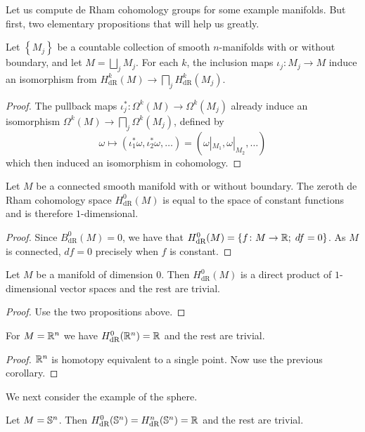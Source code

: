 \documentclass[a4paper, 12pt]{article}
\begin{document}
Let us compute de Rham cohomology groups for some example manifolds.
But first, two elementary propositions that will help us greatly.
\begin{proposition}
    Let $\left\{ M_j \right\}$ be a countable collection of smooth
    $n$-manifolds with or without boundary, and let $M = \bigsqcup_j M_j$. For
    each $k$, the inclusion maps $\iota_j \colon M_j \to M$ induce an
    isomorphism from $H_{\text{dR}}^k(M) \to \bigsqcap_j H_{\text{dR}}^k(M_j)$.
\end{proposition}
\begin{proof}
    The pullback maps $\iota_j^* \colon \Omega^k(M) \to \Omega^k(M_j)$ already induce an isomorphism $\Omega^k(M) \to \bigsqcap_j \Omega^k(M_j)$, defined by
    \[
        \omega \mapsto (\iota_1^*\omega, \iota_2^*\omega,\dots) = (\omega|_{M_1}, \omega|_{M_2},\dots)
    \]
    which then induced an isomorphism in cohomology.
\end{proof}
\begin{proposition}
    Let $M$ be a connected smooth manifold with or without boundary.
    The zeroth de Rham cohomology space $H_{\text{dR}}^0(M)$ is equal to
    the space of constant functions and is therefore $1$-dimensional.
\end{proposition}
\begin{proof}
    Since $B_{\text{dR}}^0(M) = 0$, we have that $H_{\text{dR}}^0(M) = \left\{ f \colon M \to \R ; \; df = 0 \right\}$.
    As $M$ is connected, $df = 0$ precisely when $f$ is constant.
\end{proof}
\begin{corollary}
    Let $M$ be a manifold of dimension $0$.
    Then $H_{\text{dR}}^0(M)$ is a direct product of $1$-dimensional vector spaces and the rest are trivial.
\end{corollary}
\begin{proof}
    Use the two propositions above.
\end{proof}
\begin{corollary}
    For $M = \R^n$ we have $H_{\text{dR}}^0(\R^n) = \R$ and the rest are trivial.
\end{corollary}
\begin{proof}
    $\R^n$ is homotopy equivalent to a single point.
    Now use the previous corollary.
\end{proof}
We next consider the example of the sphere.
\begin{proposition}
    Let $M = \S^n$. Then $H_{\text{dR}}^0(\S^n) = H_{\text{dR}}^n(\S^n) = \R$ and the rest are trivial.
\end{proposition}
\end{document}

